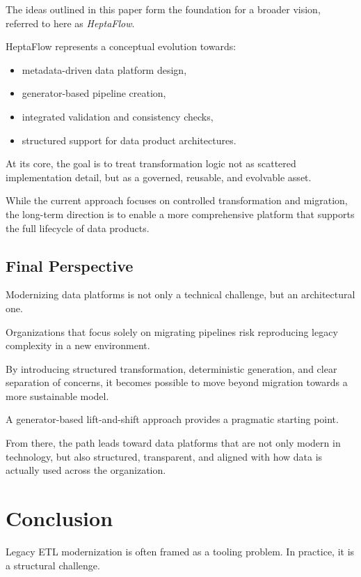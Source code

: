 \documentclass[11pt,a4paper]{article}
\begin{document}
The ideas outlined in this paper form the foundation for a broader vision, referred to here as \emph{HeptaFlow}.

HeptaFlow represents a conceptual evolution towards:
\begin{itemize}
  \item metadata-driven data platform design,
  \item generator-based pipeline creation,
  \item integrated validation and consistency checks,
  \item structured support for data product architectures.
\end{itemize}

At its core, the goal is to treat transformation logic not as scattered implementation detail, but as a governed, reusable, and evolvable asset.

While the current approach focuses on controlled transformation and migration, the long-term direction is to enable a more comprehensive platform that supports the full lifecycle of data products.

\subsection{Final Perspective}

Modernizing data platforms is not only a technical challenge, but an architectural one.

Organizations that focus solely on migrating pipelines risk reproducing legacy complexity in a new environment.

By introducing structured transformation, deterministic generation, and clear separation of concerns, it becomes possible to move beyond migration towards a more sustainable model.

A generator-based lift-and-shift approach provides a pragmatic starting point.

From there, the path leads toward data platforms that are not only modern in technology, but also structured, transparent, and aligned with how data is actually used across the organization.

\section*{Conclusion}

Legacy ETL modernization is often framed as a tooling problem. In practice, it is a structural challenge.
\end{document}
